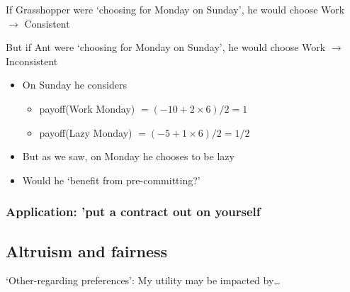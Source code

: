 \documentclass[]{article}
\providecommand{\tightlist}{%
  \setlength{\itemsep}{0pt}\setlength{\parskip}{0pt}}
\begin{document}
\bigskip

If Grasshopper were `choosing for Monday on Sunday', he would choose Work \(\rightarrow\) Consistent

\bigskip

But if Ant were `choosing for Monday on Sunday', he would choose Work \(\rightarrow\) Inconsistent

\bigskip

\begin{itemize}
\tightlist
\item
  On Sunday he considers

  \begin{itemize}
  \tightlist
  \item
    payoff(Work Monday) \(= (-10 + 2 \times 6)/2 = 1\)
  \item
    payoff(Lazy Monday) \(= (-5 + 1 \times 6)/2 = 1/2\)
  \end{itemize}
\item
  But as we saw, on Monday he chooses to be lazy
\item
  Would he `benefit from pre-committing?'
\end{itemize}

\hypertarget{application-put-a-contract-out-on-yourself}{%
\subsubsection{Application: 'put a contract out on yourself}\label{application-put-a-contract-out-on-yourself}}

\hypertarget{altruism-and-fairness}{%
\subsection{Altruism and fairness}\label{altruism-and-fairness}}

`Other-regarding preferences': My utility may be impacted by\ldots{}
\end{document}
